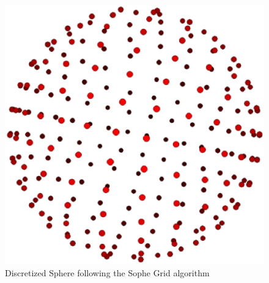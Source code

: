 \documentclass[a4paper,10pt,notitlepage]{scrreprt}
\begin{document}
\begin{figure}
 \centering
 \includegraphics[scale=0.5]{sophe-grid.eps}
 \caption{Discretized Sphere following the Sophe Grid algorithm}
 \label{fig:grid-sophe}
\end{figure}
\end{document}
